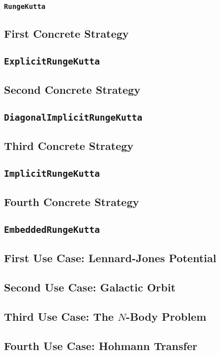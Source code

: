 		\subsubsection{\texttt{RungeKutta}}
	\subsection{First Concrete Strategy}
		\subsection{\texttt{ExplicitRungeKutta}}
	\subsection{Second Concrete Strategy}
		\subsection{\texttt{DiagonalImplicitRungeKutta}}
	\subsection{Third Concrete Strategy}
		\subsection{\texttt{ImplicitRungeKutta}}
	\subsection{Fourth Concrete Strategy}
		\subsection{\texttt{EmbeddedRungeKutta}}
	\subsection{First Use Case: Lennard-Jones Potential}
	\subsection{Second Use Case: Galactic Orbit}
	\subsection{Third Use Case: The $N$-Body Problem}
	\subsection{Fourth Use Case: Hohmann Transfer}

